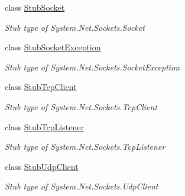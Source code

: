 \begin{DoxyCompactItemize}
class \hyperlink{class_system_1_1_net_1_1_sockets_1_1_fakes_1_1_stub_socket}{Stub\-Socket}
\begin{DoxyCompactList}\small\item\em Stub type of System.\-Net.\-Sockets.\-Socket\end{DoxyCompactList}\item 
class \hyperlink{class_system_1_1_net_1_1_sockets_1_1_fakes_1_1_stub_socket_exception}{Stub\-Socket\-Exception}
\begin{DoxyCompactList}\small\item\em Stub type of System.\-Net.\-Sockets.\-Socket\-Exception\end{DoxyCompactList}\item 
class \hyperlink{class_system_1_1_net_1_1_sockets_1_1_fakes_1_1_stub_tcp_client}{Stub\-Tcp\-Client}
\begin{DoxyCompactList}\small\item\em Stub type of System.\-Net.\-Sockets.\-Tcp\-Client\end{DoxyCompactList}\item 
class \hyperlink{class_system_1_1_net_1_1_sockets_1_1_fakes_1_1_stub_tcp_listener}{Stub\-Tcp\-Listener}
\begin{DoxyCompactList}\small\item\em Stub type of System.\-Net.\-Sockets.\-Tcp\-Listener\end{DoxyCompactList}\item 
class \hyperlink{class_system_1_1_net_1_1_sockets_1_1_fakes_1_1_stub_udp_client}{Stub\-Udp\-Client}
\begin{DoxyCompactList}\small\item\em Stub type of System.\-Net.\-Sockets.\-Udp\-Client\end{DoxyCompactList}\end{DoxyCompactItemize}
